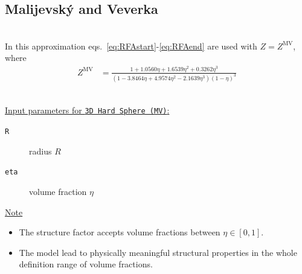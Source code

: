 \clearpage
\subsection{Malijevsk\'{y} and Veverka} \cite{Malijevsky1999} ~\\

\noindent In this approximation eqs.\ \ref{eq:RFAstart}-\ref{eq:RFAend} are used with $Z=Z^\mathrm{MV}$, where
\begin{align}
Z^\mathrm{MV} &= \frac{1 + 1.0560\eta + 1.6539\eta^2 + 0.3262\eta^3}{\left(1- 3.8464\eta + 4.9574\eta^2 -2.1639\eta^3\right)\left(1-\eta\right)^3}
\end{align}

\vspace{5mm}

\hspace{1pt}\\
\underline{Input parameters for \texttt{3D Hard Sphere (MV)}:}
\begin{description}
    \item[\texttt{R}]  radius $R$
    \item[\texttt{eta}] volume fraction $\eta$
\end{description}

\noindent
\underline{Note}
\begin{itemize}
\item The structure factor accepts volume fractions between $\eta \in [0,1]$.
\item The model lead to physically meaningful structural properties in the whole definition range of volume fractions.
\end{itemize}

